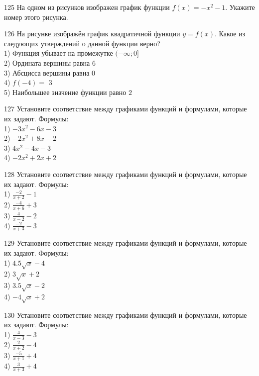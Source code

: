 \documentclass[4apaper]{article}
\begin{document}
\begin{taskBN}{125}
На одном из рисунков изображен график функции $f(x)=-x^2-1$. Укажите номер этого рисунка.
\end{taskBN}

\begin{taskBN}{126}
На рисунке изображён график квадратичной функции $y=f(x)$. Какое из следующих утверждений о данной функции верно?\\1) Функция убывает на промежутке $(-\infty;0]$\\2) Ордината вершины равна $6$\\3) Абсцисса вершины равна $0$\\4) $f(-4)=$ $3$\\5) Наибольшее значение функции равно  $2$
\end{taskBN}

\begin{taskBN}{127}
Установите соответствие между графиками функций и формулами, которые их задают. Формулы: \\1) $-3x^2-6x-3$\\2) $-2x^2+8x-2$\\3) $4x^2-4x-3$\\4) $-2x^2+2x+2$
\end{taskBN}

\begin{taskBN}{128}
Установите соответствие между графиками функций и формулами, которые их задают. Формулы: \\1) $\frac{-2}{x+2}-1$\\2) $\frac{-4}{x+6}+3$\\3) $\frac{4}{x-2}-2$\\4) $\frac{-2}{x+3}-3$
\end{taskBN}

\begin{taskBN}{129}
Установите соответствие между графиками функций и формулами, которые их задают. Формулы: \\1) $4.5\sqrt{x}-4$\\2) $3\sqrt{x}+2$\\3) $3.5\sqrt{x}-2$\\4) $-4\sqrt{x}+2$
\end{taskBN}

\begin{taskBN}{130}
Установите соответствие между графиками функций и формулами, которые их задают. Формулы: \\1) $\frac{4}{x-3}-3$\\2) $\frac{2}{x+2}-4$\\3) $\frac{-5}{x+1}+4$\\4) $\frac{3}{x+3}+4$
\end{taskBN}
\end{document}

